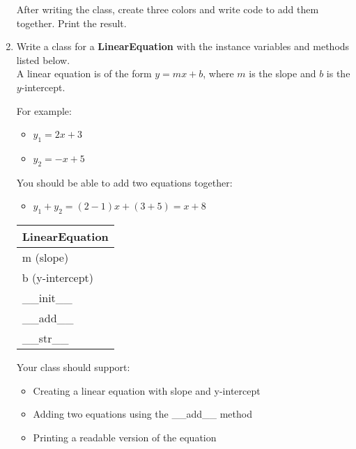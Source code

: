 \documentclass{article}
\begin{document}
\begin{enumerate}
		After writing the class, create three colors and write code to add them together.
		Print the result.

	

	\item
		Write a class for a \textbf{LinearEquation} with the instance variables and methods listed 
		below.\\ A linear equation is of the form $y = mx + b$, where $m$ is the slope and $b$ is 
		the $y$-intercept.

		\begin{minipage}[t]{0.65\textwidth}
				For example:
			\begin{itemize}
				\item $y_1 = 2x + 3$
				\item $y_2 = -x + 5$
			\end{itemize}
			You should be able to add two equations together:
			\begin{itemize}
				\item $y_1 + y_2 = (2 - 1)x + (3 + 5) = x + 8$
			\end{itemize}
		\end{minipage}
		\hfill
		\begin{minipage}[t]{0.32\textwidth}
			\vspace{0.2em}
			\begin{flushright}
				\begin{tabular}{|l|}
					\hline
					LinearEquation \\ \hline
					m (slope) \\
					b (y-intercept) \\ \hline
					\_\_init\_\_ \\
					\_\_add\_\_ \\
					\_\_str\_\_ \\ \hline
				\end{tabular}
			\end{flushright}
		\end{minipage}
		
		Your class should support:
		\begin{itemize}
			\item Creating a linear equation with slope and y-intercept
			\item Adding two equations using the \_\_add\_\_ method
			\item Printing a readable version of the equation
		\end{itemize}
		

\end{enumerate}
\end{document}
